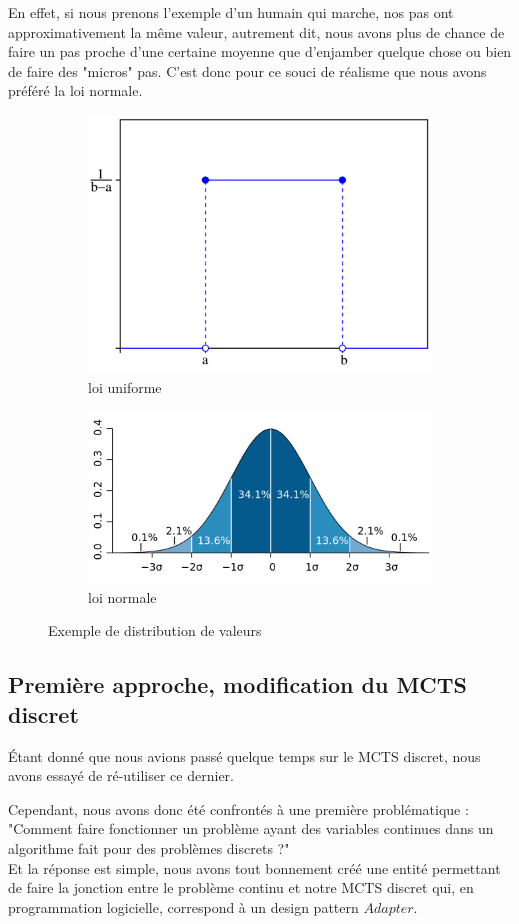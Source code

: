 \documentclass[pdftex,french, english]{article}	%
\begin{document}
En effet, si nous prenons l'exemple d'un humain qui marche, nos pas ont approximativement la même valeur, autrement dit, nous avons plus de chance de faire un pas proche d'une certaine moyenne que d'enjamber quelque chose ou bien de faire des "micros" pas. C'est donc pour ce souci de réalisme que nous avons préféré la loi normale.



\begin{figure}[H]
\centering
  \begin{subfigure}{.4\textwidth}
    \centering
    	\includegraphics[width=.4\linewidth]{uniforme.png}
      \caption{loi uniforme}
  \label{fig:uniforme}
  \end{subfigure}
  \begin{subfigure}{.4\textwidth}
    \centering
        \includegraphics[width=.4\linewidth]{gaussien.png}
      \caption{loi normale}
  \label{fig:normale}
  \end{subfigure}
\caption{Exemple de distribution de valeurs}
\end{figure}


	\subsection{Première approche, modification du MCTS discret} \label{modifDiscret}

		Étant donné que nous avions passé quelque temps sur le MCTS discret, nous avons essayé de ré-utiliser ce dernier.

		Cependant, nous avons donc été confrontés à une première problématique : "Comment faire fonctionner un problème ayant des variables continues dans un algorithme fait pour des problèmes discrets ?" \\

		Et la réponse est simple, nous avons tout bonnement créé une entité permettant de faire la jonction entre le problème continu et notre MCTS discret qui, en programmation logicielle, correspond à un design pattern $Adapter$.\\
\end{document}
